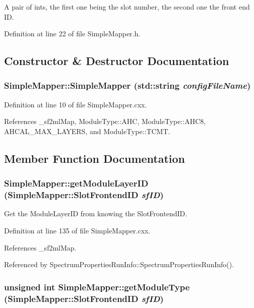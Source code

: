 A pair of ints, the first one being the slot number, the second one the front end ID. 

Definition at line 22 of file SimpleMapper.h.

\subsection{Constructor \& Destructor Documentation}
\hypertarget{class_simple_mapper_aac9a4d9921f0f079f2f0a4778a83c27d}{
\subsubsection[{SimpleMapper}]{\setlength{\rightskip}{0pt plus 5cm}SimpleMapper::SimpleMapper (std::string {\em configFileName})}}
\label{class_simple_mapper_aac9a4d9921f0f079f2f0a4778a83c27d}


Definition at line 10 of file SimpleMapper.cxx.

References \_\-sf2mlMap, ModuleType::AHC, ModuleType::AHC8, AHCAL\_\-MAX\_\-LAYERS, and ModuleType::TCMT.

\subsection{Member Function Documentation}
\hypertarget{class_simple_mapper_a33ffad5d6bdccd5347630b65764e4b99}{
\subsubsection[{getModuleLayerID}]{ SimpleMapper::getModuleLayerID ({\bf SimpleMapper::SlotFrontendID} {\em sfID})}}
\label{class_simple_mapper_a33ffad5d6bdccd5347630b65764e4b99}


Get the ModuleLayerID from knowing the SlotFrontendID. 

Definition at line 135 of file SimpleMapper.cxx.

References \_\-sf2mlMap.

Referenced by SpectrumPropertiesRunInfo::SpectrumPropertiesRunInfo().\hypertarget{class_simple_mapper_a857de2500f82b01e1a6f116df8aed8a6}{
\subsubsection[{getModuleType}]{\setlength{\rightskip}{0pt plus 5cm}unsigned int SimpleMapper::getModuleType ({\bf SimpleMapper::SlotFrontendID} {\em sfID})}}
\label{class_simple_mapper_a857de2500f82b01e1a6f116df8aed8a6}


